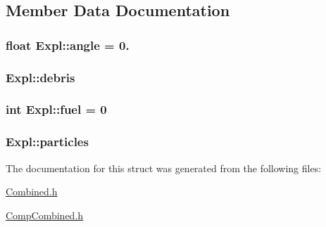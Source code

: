 \subsection{Member Data Documentation}
\hypertarget{structExpl_ab2bb9e602db2eb154e8808706b9058d1}{
\subsubsection[{angle}]{\setlength{\rightskip}{0pt plus 5cm}float Expl\-::angle = 0.}}\label{structExpl_ab2bb9e602db2eb154e8808706b9058d1}
\hypertarget{structExpl_a5b0ae442e25ea6bd2b20e8d84b83a4ce}{
\subsubsection[{debris}]{ Expl\-::debris}}\label{structExpl_a5b0ae442e25ea6bd2b20e8d84b83a4ce}
\hypertarget{structExpl_a36661564535ffc28e3abe35daab49572}{
\subsubsection[{fuel}]{\setlength{\rightskip}{0pt plus 5cm}int Expl\-::fuel = 0}}\label{structExpl_a36661564535ffc28e3abe35daab49572}
\hypertarget{structExpl_aae5280abce86978acbbac2167b0720bd}{
\subsubsection[{particles}]{ Expl\-::particles}}\label{structExpl_aae5280abce86978acbbac2167b0720bd}


The documentation for this struct was generated from the following files\-:\begin{DoxyCompactItemize}
\item 
\hyperlink{Combined_8h}{Combined.\-h}\item 
\hyperlink{CompCombined_8h}{Comp\-Combined.\-h}\end{DoxyCompactItemize}
